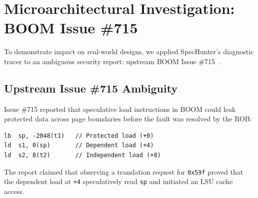 \documentclass[conference,10pt]{IEEEtran}
\begin{document}
\section{Microarchitectural Investigation: BOOM Issue \#715}
To demonstrate impact on real-world designs, we applied SpecHunter's diagnostic tracer to an ambiguous security report: upstream BOOM Issue \#715~\cite{boomissue715}.

\subsection{Upstream Issue \#715 Ambiguity}
Issue \#715 reported that speculative load instructions in BOOM could leak protected data across page boundaries before the fault was resolved by the ROB:
\begin{verbatim}
lb  sp, -2048(t1)   // Protected load (+0)
ld  s1, 0(sp)       // Dependent load (+4)
ld  s2, 8(t2)       // Independent load (+8)
\end{verbatim}
The report claimed that observing a translation request for \texttt{0x59f} proved that the dependent load at \texttt{+4} speculatively read \texttt{sp} and initiated an LSU cache access.
\end{document}
